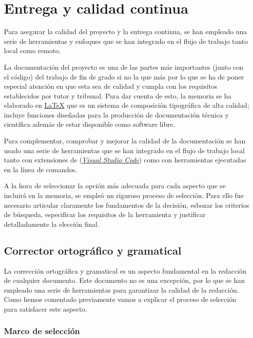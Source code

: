 \section{Entrega y calidad continua}

Para asegurar la calidad del proyecto y la entrega continua, se han empleado una serie de herramientas y enfoques que se han integrado en el flujo de trabajo tanto local como remoto.

La documentación del proyecto es una de las partes más importantes (junto con el código) del trabajo de fin de grado si no la que más por lo que se ha de poner especial atención en que esta sea de calidad y cumpla con los requisitos establecidos por tutor y tribunal. Para dar cuenta de esto, la memoria se ha elaborado en \href{https://www.latex-project.org/}{\LaTeX{}} que es un sistema de composición tipográfica de alta calidad; incluye funciones diseñadas para la producción de documentación técnica y científica además de estar disponible como software libre.

Para complementar, comprobar y mejorar la calidad de la documentación se han usado una serie de herramientas que se han integrado en el flujo de trabajo local tanto con extensiones de (\href{https://code.visualstudio.com/}{\textit{Visual Studio Code}}) como con herramientas ejecutadas en la línea de comandos.

A la hora de seleccionar la opción más adecuada para cada aspecto que se incluirá en la memoria, se empleó un riguroso proceso de selección. Para ello fue necesario articular claramente los fundamentos de la decisión, esbozar los criterios de búsqueda, especificar los requisitos de la herramienta y justificar detalladamente la elección final.

\subsection{Corrector ortográfico y gramatical}

La corrección ortográfica y gramatical es un aspecto fundamental en la redacción de cualquier documento. Este documento no es una excepción, por lo que se han empleado una serie de herramientas para garantizar la calidad de la redacción. Como hemos comentado previamente vamos a explicar el proceso de selección para satisfacer este aspecto.

\subsubsection{Marco de selección}

